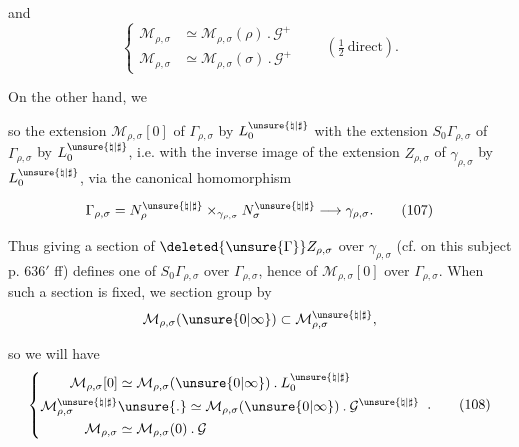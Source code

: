 and 
\[
\left\{\begin{aligned}
\mathcal{M}_{\rho,\sigma}&\simeq\mathcal{M}_{\rho,\sigma}(\rho)\mathbin{.}\mathcal{G}^+\\
\mathcal{M}_{\rho,\sigma}&\simeq\mathcal{M}_{\rho,\sigma}(\sigma)\mathbin{.}\mathcal{G}^+
\end{aligned}\right.
\qquad(\tfrac12\ \text{direct}).
\tag{105}
\]

On the other hand, we 

so the extension $\mathcal{M}_{\rho,\sigma}[0]$ of $\Gamma_{\rho,\sigma}$ by $L_0^{\unsure{\natural|\sharp}}$  with the extension $S_0\Gamma_{\rho,\sigma}$ of $\Gamma_{\rho,\sigma}$ by $L_0^{\unsure{\natural|\sharp}}$, i.e. with the inverse image of the extension $Z_{\rho,\sigma}$ of $\gamma_{\rho,\sigma}$ by $L_0^{\unsure{\natural|\sharp}}$, via the canonical homomorphism




\[
\Gamma_{\rho,\sigma}
=N_\rho^{\unsure{\natural|\sharp}}\mathbin{\times}_{\gamma_{\rho,\sigma}}N_\sigma^{\unsure{\natural|\sharp}}
\longrightarrow\gamma_{\rho,\sigma}.
\tag{107}
\]

Thus giving a section of $\deleted{\unsure{\Gamma}}Z_{\rho,\sigma}$ over $\gamma_{\rho,\sigma}$ (cf. on this subject p. $636'$ ff) defines one of $S_0\Gamma_{\rho,\sigma}$ over $\Gamma_{\rho,\sigma}$, hence of $\mathcal{M}_{\rho,\sigma}[0]$ over $\Gamma_{\rho,\sigma}$. When such a section is fixed, we   section group by
\[
\mathcal{M}_{\rho,\sigma}(\unsure{0|\infty})
\subset\mathcal{M}_{\rho,\sigma}^{\unsure{\natural|\sharp}},
\]

so we will have
\[
\left\{\begin{aligned}
\mathcal{M}_{\rho,\sigma}[0]
&\simeq\mathcal{M}_{\rho,\sigma}(\unsure{0|\infty})\mathbin{.}L_0^{\unsure{\natural|\sharp}}\\
\mathcal{M}_{\rho,\sigma}^{\unsure{\natural|\sharp}}
&\unsure{\mathbin{.}}\simeq\mathcal{M}_{\rho,\sigma}(\unsure{0|\infty})\mathbin{.}\mathcal{G}^{\unsure{\natural|\sharp}}\\
\mathcal{M}_{\rho,\sigma}
&\simeq\mathcal{M}_{\rho,\sigma}(0)\mathbin{.}\mathcal{G}
\end{aligned}\right.
\;.
\tag{108}
\]


